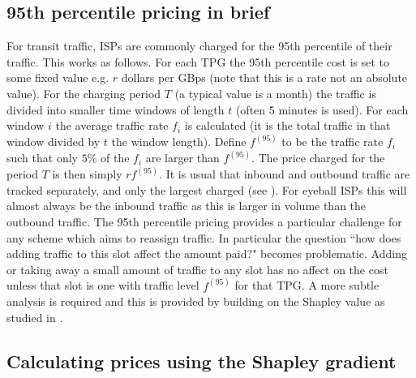 \subsection{95th percentile pricing in brief}
\label{sec:percentile}

For transit traffic, ISPs are commonly charged for
the 95th percentile of their traffic.  This works as follows.
For each TPG
the 95th percentile cost is set to some fixed value
e.g. $r$ dollars per GBps (note that this is a rate not an
absolute value). For the charging
period $T$ (a typical
value is a month)
the traffic is divided into smaller  
time windows of length $t$ (often 5 minutes is used).
For each window $i$ the average traffic rate $f_i$ is calculated 
(it is the total traffic in that window divided by $t$ the window
length).
Define $f^{(95)}$ to
be the traffic rate $f_i$ such that only $5\%$ of the 
$f_i$ are larger than $f^{(95)}$.
The price charged for the period $T$ is then simply $r f^{(95)}$.
It is usual that inbound and outbound traffic are tracked
separately, and only the largest charged (see \cite{dimitr2009perc}).
For eyeball ISPs this will almost always be the inbound traffic as this
is larger in volume than the outbound traffic.
The 95th percentile pricing provides a particular challenge for any scheme 
which aims to reassign traffic.  In particular the question ``how
does adding traffic to this slot affect the amount paid?" becomes
problematic.  Adding or taking away a small amount of traffic to any
slot has no affect on the cost unless that slot is one with 
traffic level $f^{(95)}$ for that TPG.  A more subtle analysis is
required and this is provided by building on the Shapley value as
studied in \cite{stanojevic2010heavy}.  

\subsection{Calculating prices using the Shapley gradient}
\label{sec:shapleygradient}

